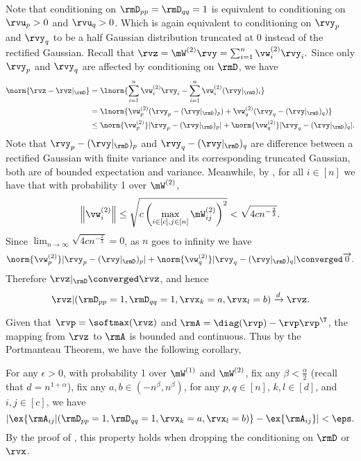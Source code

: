 \begin{proofof}{}
Note that conditioning on $\rmD_{pp}=\rmD_{qq}=1$ is equivalent to conditioning on $\rvu_p>0$ and $\rvu_q>0$. Which is again equivalent to conditioning on $\rvy_p$ and $\rvy_q$ to be a half Gaussian distribution truncated at 0 instead of the rectified Gaussian. Recall that $\rvz=\mW^{(2)}\rvy = \sum_{i=1}^n\vw^{(2)}_i\rvy_i.$ Since only $\rvy_p$ and $\rvy_q$ are affected by conditioning on $\rmD$, we have\begin{equation}
\begin{split}
\norm{\rvz - \rvz|_\rmD} &=\lnorm{ \sum_{i=1}^n\vw^{(2)}_i\rvy_i - \sum_{i=1}^n\vw^{(2)}_i(\rvy|_\rmD)_i}\\
&= \lnorm{\vw^{(2)}_p(\rvy_p-(\rvy|_\rmD)_p) + \vw^{(2)}_q(\rvy_q-(\rvy|_\rmD)_q)}\\
&\leq \norm{\vw^{(2)}_p}|\rvy_p-(\rvy|_\rmD)_p| + \norm{\vw^{(2)}_q}|\rvy_q-(\rvy|_\rmD)_q|.
\end{split}
\end{equation}
Note that $\rvy_p-(\rvy|_\rmD)_p$ and $\rvy_q-(\rvy|_\rmD)_q$ are difference between a rectified Gaussian with finite variance and its corresponding truncated Gaussian, both are of bounded expectation and variance. Meanwhile, by , for all $i\in[n]$ we have that with probability 1 over $\mW^{(2)}$,
\begin{equation}
    \left\Vert\vw^{(2)}_i\right\Vert \leq \sqrt{c\left(\max_{i\in[c],j\in[n]}\mW^{(2)}_{ij}\right)^2} < \sqrt{4cn^{-\frac{2}{3}}}.
\end{equation}
Since $\lim_{n\to\infty}\sqrt{4cn^{-\frac{2}{3}}}=0$, as $n$ goes to infinity we have \begin{equation}
\norm{\vw^{(2)}_p}|\rvy_p-(\rvy|_\rmD)_p| + \norm{\vw^{(2)}_q}|\rvy_q-(\rvy|_\rmD)_q|\converged \overrightarrow{0}.
\end{equation}
Therefore $\rvz|_\rmD\converged\rvz$, and hence
\begin{equation}
    \rvz\vert(\rmD_{pp}=1, \rmD_{qq}=1, \rvx_k=a, \rvx_l=b)\xrightarrow{d} \rvz.
\end{equation}
\end{proofof}

Given that $\rvp=\softmax(\rvz)$ and $\rmA=\diag(\rvp)-\rvp\rvp^\T$, the mapping from $\rvz$ to $\rmA$ is bounded and continuous. Thus by the Portmanteau Theorem, we have the following corollary,
\begin{corollary}
\label{cor:A-invariant}
For any $\epsilon>0$, with probability 1 over $\mW^{(1)}$ and $\mW^{(2)}$, fix any $\beta < \frac\alpha2$ (recall that $d=n^{1+\alpha}$), fix any $a,b\in (-n^{\beta}, n^{\beta})$, for any $p,q\in[n]$, $k,l\in[d]$, and $i,j\in[c]$,  we have \begin{equation}
    |\ex{\rmA_{ij}\vert(\rmD_{pp}=1, \rmD_{qq}=1, \rvx_k=a, \rvx_l=b)} - \ex{\rmA_{ij}}| < \eps.
\end{equation}
By the proof of , this property holds when dropping the conditioning on $\rmD$ or $\rvx$. 
\end{corollary}
